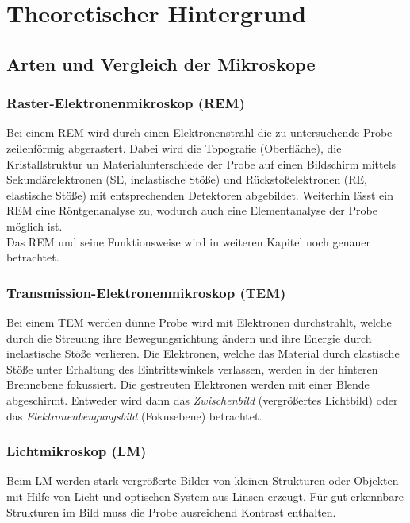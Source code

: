 
\chapter{Theoretischer Hintergrund}
\label{chap:fvz}

\section{Arten und Vergleich der Mikroskope}
\label{sec:artenEM}

\subsection*{Raster-Elektronenmikroskop (REM)}
Bei einem REM wird durch einen Elektronenstrahl die zu untersuchende Probe zeilenförmig abgerastert. Dabei wird die Topografie (Oberfläche), die Kristallstruktur un Materialunterschiede der Probe auf einen Bildschirm mittels Sekundärelektronen (SE, inelastische Stöße) und Rückstoßelektronen (RE, elastische Stöße) mit entsprechenden Detektoren abgebildet. Weiterhin lässt ein REM eine Röntgenanalyse zu, wodurch auch eine Elementanalyse der Probe möglich ist. \citep{RasterEM}\\
Das REM und seine Funktionsweise wird in weiteren Kapitel noch genauer betrachtet.

\subsection*{Transmission-Elektronenmikroskop (TEM)}
Bei einem TEM werden dünne Probe wird mit Elektronen durchstrahlt, welche durch die Streuung ihre Bewegungsrichtung ändern und ihre Energie durch inelastische Stöße verlieren. Die Elektronen, welche das Material durch elastische Stöße unter Erhaltung des Eintrittswinkels verlassen, werden in der hinteren Brennebene fokussiert. Die gestreuten Elektronen werden mit einer Blende abgeschirmt. Entweder wird dann das \textit{Zwischenbild} (vergrößertes Lichtbild) oder das \textit{Elektronenbeugungsbild} (Fokusebene) betrachtet. %

\subsection*{Lichtmikroskop (LM)}
Beim LM werden stark vergrößerte Bilder von kleinen Strukturen oder Objekten mit Hilfe von Licht und optischen System aus Linsen erzeugt. Für gut erkennbare Strukturen im Bild muss die Probe ausreichend Kontrast enthalten. %

